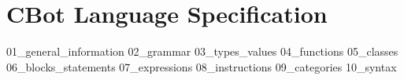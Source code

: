 
\part{CBot Language Specification}

{01_general_information}
{02_grammar}
{03_types_values}
{04_functions}
{05_classes}
{06_blocks_statements}
{07_expressions}
{08_instructions}
{09_categories}
{10_syntax}
